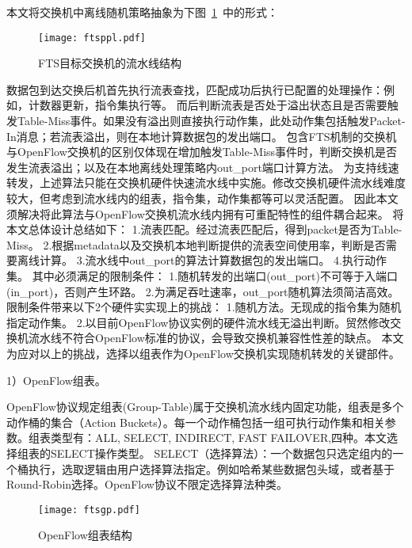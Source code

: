 本文将交换机中离线随机策略抽象为下图~\ref{fig:ftsppl}~中的形式：

\begin{figure}[!ht]
	\vspace{-1.5mm}
	\centering 
	\texttt{[image: ftsppl.pdf]}
	\caption{FTS目标交换机的流水线结构} \label{fig:ftsppl}
\end{figure}


数据包到达交换后机首先执行流表查找，匹配成功后执行已配置的处理操作：例如，计数器更新，指令集执行等。
而后判断流表是否处于溢出状态且是否需要触发Table-Miss事件。如果没有溢出则直接执行动作集，此处动作集包括触发Packet-In消息；若流表溢出，则在本地计算数据包的发出端口。%
包含FTS机制的交换机与OpenFlow交换机的区别仅体现在增加触发Table-Miss事件时，判断交换机是否发生流表溢出；以及在本地离线处理策略内out\_port端口计算方法。
为支持线速转发，上述算法只能在交换机硬件快速流水线中实施。修改交换机硬件流水线难度较大，但考虑到流水线内的组表，指令集，动作集都等可以灵活配置。
因此本文须解决将此算法与OpenFlow交换机流水线内拥有可重配特性的组件耦合起来。
将本文总体设计总结如下：
1.流表匹配。经过流表匹配后，得到packet是否为Table-Miss。 
2.根据metadata以及交换机本地判断提供的流表空间使用率，判断是否需要离线计算。
3.流水线中out\_port的算法计算数据包的发出端口。
4.执行动作集。
其中必须满足的限制条件：
1.随机转发的出端口(out\_port)不可等于入端口(in\_port)，否则产生环路。
2.为满足吞吐速率，out\_port随机算法须简洁高效。
限制条件带来以下2个硬件实实现上的挑战：
1.随机方法。无现成的指令集为随机指定动作集。
2.以目前OpenFlow协议实例的硬件流水线无溢出判断。贸然修改交换机流水线不符合OpenFlow标准的协议，会导致交换机兼容性性差的缺点。
本文为应对以上的挑战，选择以组表作为OpenFlow交换机实现随机转发的关键部件。




1）OpenFlow组表。

OpenFlow协议规定组表(Group-Table)属于交换机流水线内固定功能，组表是多个动作桶的集合（Action Buckets）。每一个动作桶包括一组可执行动作集和相关参数。组表类型有：ALL, SELECT, INDIRECT, FAST FAILOVER,四种。本文选择组表的SELECT操作类型。
SELECT（选择算法）：一个数据包只选定组内的一个桶执行，选取逻辑由用户选择算法指定。例如哈希某些数据包头域，或者基于Round-Robin选择。OpenFlow协议不限定选择算法种类。

\begin{figure}[!ht]
	\centering 
	\vspace{-1.5mm} 
	\texttt{[image: ftsgp.pdf]}
	\caption{OpenFlow组表结构} \label{fig:ftsgp}
\end{figure}

